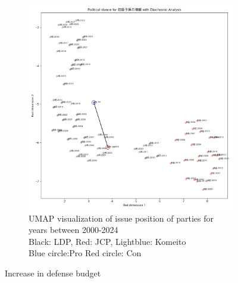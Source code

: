 \documentclass[final,5p,times,twocolumn,authoryear]{elsarticle}
\begin{document}
\begin{figure}[h]
\begin{subfigure}{0.48\textwidth}
		  \includegraphics[width=\textwidth]{figs/results/diachronic_defence/防衛予算の増額_diachronic_umap.png}
		  \caption{UMAP visualization of issue position of parties for years between 2000-2024 \\\hspace{\textwidth} 
		  Black: LDP, Red: JCP, Lightblue: Komeito\\\hspace{\textwidth}
		  Blue circle:Pro Red circle: Con }
		  \label{fig:sub2}
		\end{subfigure}
	\caption{Increase in defense budget}
	\label{fig: results-diachronic-defense-budget}
\end{figure}
\end{document}
